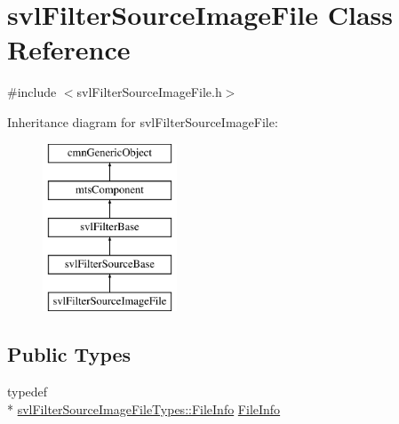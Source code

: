 \hypertarget{classsvl_filter_source_image_file}{\section{svl\-Filter\-Source\-Image\-File Class Reference}
\label{classsvl_filter_source_image_file}
}


{\ttfamily \#include $<$svl\-Filter\-Source\-Image\-File.\-h$>$}

Inheritance diagram for svl\-Filter\-Source\-Image\-File\-:\begin{figure}[H]
\begin{center}
\leavevmode
\includegraphics[height=5.000000cm]{d3/dcc/classsvl_filter_source_image_file}
\end{center}
\end{figure}
\subsection*{Public Types}
\begin{DoxyCompactItemize}
\item 
typedef \\*
\hyperlink{classsvl_filter_source_image_file_types_1_1_file_info}{svl\-Filter\-Source\-Image\-File\-Types\-::\-File\-Info} \hyperlink{classsvl_filter_source_image_file_a0acade731f76b2a1adc5a6a43417c4f4}{File\-Info}
\end{DoxyCompactItemize}
